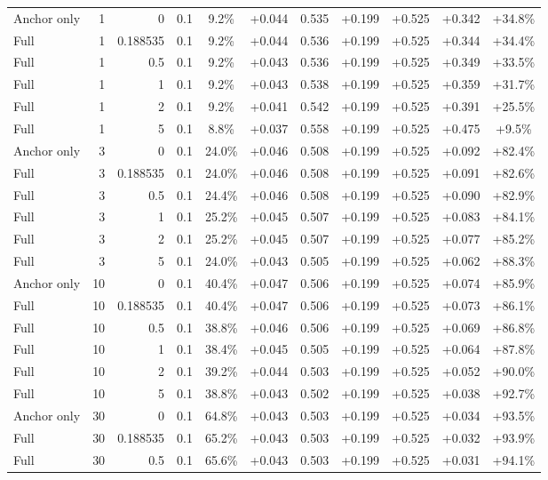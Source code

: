 \begin{table}[htbp]
\begin{tabular}{lrrrccccccc}
Anchor only & 1 & 0 & 0.1 & 9.2\% & +0.044 & 0.535 & +0.199 & +0.525 & +0.342 & +34.8\% \\
Full & 1 & 0.188535 & 0.1 & 9.2\% & +0.044 & 0.536 & +0.199 & +0.525 & +0.344 & +34.4\% \\
Full & 1 & 0.5 & 0.1 & 9.2\% & +0.043 & 0.536 & +0.199 & +0.525 & +0.349 & +33.5\% \\
Full & 1 & 1 & 0.1 & 9.2\% & +0.043 & 0.538 & +0.199 & +0.525 & +0.359 & +31.7\% \\
Full & 1 & 2 & 0.1 & 9.2\% & +0.041 & 0.542 & +0.199 & +0.525 & +0.391 & +25.5\% \\
Full & 1 & 5 & 0.1 & 8.8\% & +0.037 & 0.558 & +0.199 & +0.525 & +0.475 & +9.5\% \\
Anchor only & 3 & 0 & 0.1 & 24.0\% & +0.046 & 0.508 & +0.199 & +0.525 & +0.092 & +82.4\% \\
Full & 3 & 0.188535 & 0.1 & 24.0\% & +0.046 & 0.508 & +0.199 & +0.525 & +0.091 & +82.6\% \\
Full & 3 & 0.5 & 0.1 & 24.4\% & +0.046 & 0.508 & +0.199 & +0.525 & +0.090 & +82.9\% \\
Full & 3 & 1 & 0.1 & 25.2\% & +0.045 & 0.507 & +0.199 & +0.525 & +0.083 & +84.1\% \\
Full & 3 & 2 & 0.1 & 25.2\% & +0.045 & 0.507 & +0.199 & +0.525 & +0.077 & +85.2\% \\
Full & 3 & 5 & 0.1 & 24.0\% & +0.043 & 0.505 & +0.199 & +0.525 & +0.062 & +88.3\% \\
Anchor only & 10 & 0 & 0.1 & 40.4\% & +0.047 & 0.506 & +0.199 & +0.525 & +0.074 & +85.9\% \\
Full & 10 & 0.188535 & 0.1 & 40.4\% & +0.047 & 0.506 & +0.199 & +0.525 & +0.073 & +86.1\% \\
Full & 10 & 0.5 & 0.1 & 38.8\% & +0.046 & 0.506 & +0.199 & +0.525 & +0.069 & +86.8\% \\
Full & 10 & 1 & 0.1 & 38.4\% & +0.045 & 0.505 & +0.199 & +0.525 & +0.064 & +87.8\% \\
Full & 10 & 2 & 0.1 & 39.2\% & +0.044 & 0.503 & +0.199 & +0.525 & +0.052 & +90.0\% \\
Full & 10 & 5 & 0.1 & 38.8\% & +0.043 & 0.502 & +0.199 & +0.525 & +0.038 & +92.7\% \\
Anchor only & 30 & 0 & 0.1 & 64.8\% & +0.043 & 0.503 & +0.199 & +0.525 & +0.034 & +93.5\% \\
Full & 30 & 0.188535 & 0.1 & 65.2\% & +0.043 & 0.503 & +0.199 & +0.525 & +0.032 & +93.9\% \\
Full & 30 & 0.5 & 0.1 & 65.6\% & +0.043 & 0.503 & +0.199 & +0.525 & +0.031 & +94.1\% \\

\end{tabular}
\end{table}
